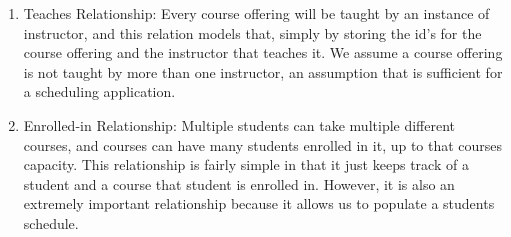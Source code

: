 \documentclass[pdftex,12pt,letter]{article}
\begin{document}
\begin{enumerate}[1.]
\item Teaches Relationship: Every course offering will be taught by an instance of instructor, and this relation models that, simply by storing the id's for the course offering and the instructor that teaches it. We assume a course offering is not taught by more than one instructor, an assumption that is sufficient for a scheduling application.
\item Enrolled-in Relationship: Multiple students can take multiple different courses, and courses can have many students enrolled in it, up to that courses capacity. This relationship is fairly simple in that it just keeps track of a student and a course that student is enrolled in. However, it is also an extremely important relationship because it allows us to populate a students schedule.
\end{enumerate}
\end{document}
